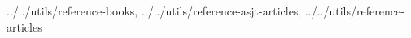 


{
    ../../utils/reference-books,
    ../../utils/reference-asjt-articles,
    ../../utils/reference-articles
}
\vspace{8mm}

